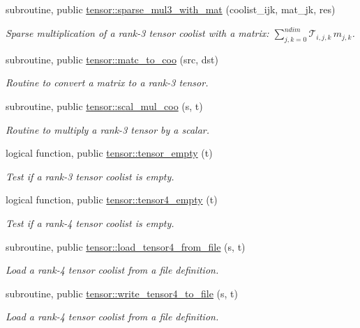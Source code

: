 \begin{DoxyCompactItemize}
subroutine, public \hyperlink{namespacetensor_a33bc74f9042478d58240b1a1a91db91d}{tensor\+::sparse\+\_\+mul3\+\_\+with\+\_\+mat} (coolist\+\_\+ijk, mat\+\_\+jk, res)
\begin{DoxyCompactList}\small\item\em Sparse multiplication of a rank-\/3 tensor coolist with a matrix\+: ${\displaystyle \sum_{j,k=0}^{ndim}} \mathcal{T}_{i,j,k} \, m_{j,k}$. \end{DoxyCompactList}\item 
subroutine, public \hyperlink{namespacetensor_ad868662d382dc1579db6847f2411c382}{tensor\+::matc\+\_\+to\+\_\+coo} (src, dst)
\begin{DoxyCompactList}\small\item\em Routine to convert a matrix to a rank-\/3 tensor. \end{DoxyCompactList}\item 
subroutine, public \hyperlink{namespacetensor_af105ec6083969c52f5e7422d75a5cda5}{tensor\+::scal\+\_\+mul\+\_\+coo} (s, t)
\begin{DoxyCompactList}\small\item\em Routine to multiply a rank-\/3 tensor by a scalar. \end{DoxyCompactList}\item 
logical function, public \hyperlink{namespacetensor_ab08af814baeb0b670bd5d587ca578239}{tensor\+::tensor\+\_\+empty} (t)
\begin{DoxyCompactList}\small\item\em Test if a rank-\/3 tensor coolist is empty. \end{DoxyCompactList}\item 
logical function, public \hyperlink{namespacetensor_a9b00b4f3cebb865971bcbaf818602ddc}{tensor\+::tensor4\+\_\+empty} (t)
\begin{DoxyCompactList}\small\item\em Test if a rank-\/4 tensor coolist is empty. \end{DoxyCompactList}\item 
subroutine, public \hyperlink{namespacetensor_a373dab2b483b4bc5f521934660d289aa}{tensor\+::load\+\_\+tensor4\+\_\+from\+\_\+file} (s, t)
\begin{DoxyCompactList}\small\item\em Load a rank-\/4 tensor coolist from a file definition. \end{DoxyCompactList}\item 
subroutine, public \hyperlink{namespacetensor_a328cec7eb0ae3c472db0f9ccdd475763}{tensor\+::write\+\_\+tensor4\+\_\+to\+\_\+file} (s, t)
\begin{DoxyCompactList}\small\item\em Load a rank-\/4 tensor coolist from a file definition. \end{DoxyCompactList}\end{DoxyCompactItemize}
